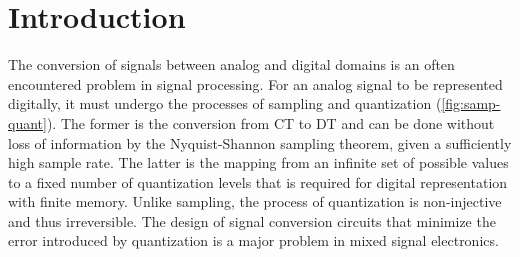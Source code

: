 
\chapter{Introduction}
\label{ch:Introduction}

The conversion of signals between analog and digital domains is an often encountered problem in signal processing. For an analog signal to be represented digitally, it must undergo the processes of sampling and quantization (\autoref{fig:samp-quant}). The former is the conversion from \gls{CT} to \gls{DT} and can be done without loss of information by the Nyquist-Shannon sampling theorem, given a sufficiently high sample rate. The latter is the mapping from an infinite set of possible values to a fixed number of quantization levels that is required for digital representation with finite memory. Unlike sampling, the process of quantization is non-injective and thus irreversible. The design of signal conversion circuits that minimize the error introduced by quantization is a major problem in mixed signal electronics.

